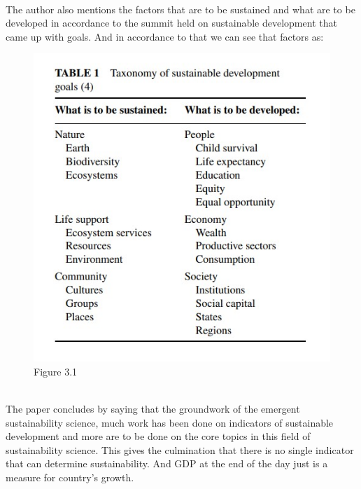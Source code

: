 \documentclass[conference]{IEEEtran}
\begin{document}
\\The author also mentions the factors that are to be sustained and what are to be developed in accordance to the summit held on sustainable development that came up with goals. And in
accordance to that we can see that factors as:
\begin{figure}[htbp]
    \centerline{\includegraphics[scale=0.6]{sustainability.jpg}}
    \caption{Figure 3.1}
\end{figure}
\\ The paper concludes by saying that the groundwork of the emergent sustainability science, much work has been done on indicators of
sustainable development and more are to be done on the core topics in this field of sustainability science. This gives the culmination that there is no single indicator that can determine sustainability. And GDP at the end of the day just is a measure for country's growth.
\end{document}
